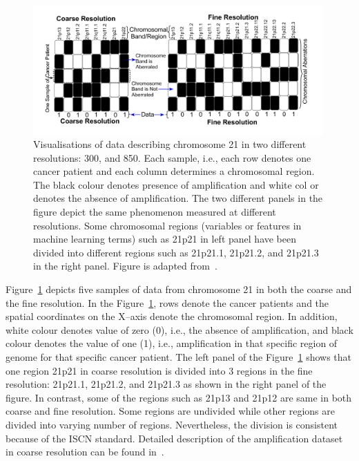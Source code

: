 \begin{figure}[h!]
\centering
\includegraphics[trim=10mm 10mm 20mm 2mm,width=0.99\textwidth]{figures/data21multi}
\caption[Multiple Resolution in Chromosome 21.]
{Visualisations of data describing chromosome 21 in two different 
resolutions: 300, and 850. Each sample, i.e., each row denotes one 
cancer patient and each column determines a chromosomal region. 
The black colour denotes presence of amplification and white col or 
denotes the absence of amplification. The two different panels in 
the figure depict the same phenomenon measured at different resolutions.
Some chromosomal regions (variables or features in machine learning 
terms) such as 21p21 in left panel have been divided into different 
regions such as 21p21.1, 21p21.2, and 21p21.3 in the right panel. 
Figure is adapted from~.} 
\label{Fig:datamulti}
\end{figure}


Figure~\ref{Fig:datamulti} depicts five samples of data from 
chromosome 21 in both the coarse and the fine resolution.
In the Figure~\ref{Fig:datamulti}, rows denote the cancer patients 
and the spatial coordinates on the X--axis denote the chromosomal 
region.  In addition, white colour denotes value of zero (0), i.e.,
the absence of amplification, and  black colour denotes the value 
of one (1), i.e., amplification in that specific region of genome 
for that specific cancer patient. The left panel of the  
Figure~\ref{Fig:datamulti} shows that one region 21p21 in coarse 
resolution is divided into 3 regions in the fine resolution:  
21p21.1, 21p21.2, and 21p21.3 as shown in the right panel of the
figure. In contrast, some of the regions such as 21p13 and 21p12 
are same in both coarse and fine resolution. 
Some regions are undivided while other
regions are divided into varying number of regions. Nevertheless, 
the division is consistent because of the ISCN standard. Detailed 
description of the amplification dataset in coarse resolution 
can be found  in~\cite{myllykangas06}.








